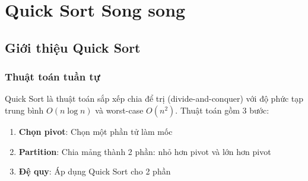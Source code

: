 \chapter{Quick Sort Song song}
\label{chap:quicksort}

\section{Giới thiệu Quick Sort}

\subsection{Thuật toán tuần tự}

Quick Sort là thuật toán sắp xếp chia để trị (divide-and-conquer) với độ phức tạp trung bình $O(n \log n)$ và worst-case $O(n^2)$. Thuật toán gồm 3 bước:

\begin{enumerate}
    \item \textbf{Chọn pivot}: Chọn một phần tử làm mốc
    \item \textbf{Partition}: Chia mảng thành 2 phần: nhỏ hơn pivot và lớn hơn pivot
    \item \textbf{Đệ quy}: Áp dụng Quick Sort cho 2 phần
\end{enumerate}

